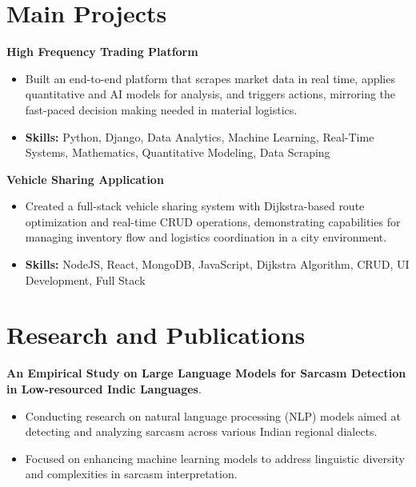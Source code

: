 \documentclass[a4paper,11pt]{article}
\begin{document}
\section{\textbf{Main Projects}}

\vspace{1mm}
  \textbf{High Frequency Trading Platform  }
\vspace{-1.5mm} %
\begin{itemize}
  \item Built an end-to-end platform that scrapes market data in real time, applies quantitative and AI models for analysis, and triggers actions, mirroring the fast-paced decision making needed in material logistics.
\vspace{-3mm}
  \item \textbf{Skills:} Python, Django, Data Analytics, Machine Learning, Real-Time Systems, Mathematics, Quantitative Modeling, Data Scraping
\end{itemize}


\vspace{1mm}
   \textbf{Vehicle Sharing Application }
\vspace{-1.5mm} %
\begin{itemize}
  \item Created a full-stack vehicle sharing system with Dijkstra-based route optimization and real-time CRUD operations, demonstrating capabilities for managing inventory flow and logistics coordination in a city environment.
\vspace{-3mm}
  \item \textbf{Skills:} NodeJS, React, MongoDB, JavaScript, Dijkstra Algorithm, CRUD, UI Development, Full Stack
\end{itemize}



\section{\textbf{Research and Publications} \hfill }
\vspace{1mm}
  \textbf{An Empirical Study on Large Language Models for Sarcasm Detection in Low-resourced Indic Languages}.
\vspace{-1mm} %
\begin{itemize}
  \item Conducting research on natural language processing (NLP) models aimed at detecting and analyzing sarcasm across various Indian regional dialects.
\vspace{-3mm}
  \item Focused on enhancing machine learning models to address linguistic diversity and complexities in sarcasm interpretation.
\end{itemize}
\end{document}
